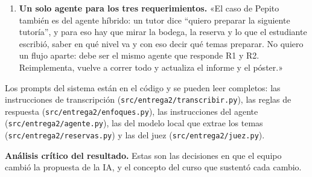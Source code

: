 \documentclass[11pt,letterpaper]{article}
\newcommand{\cod}[1]{\texttt{\small #1}}
\begin{document}
\begin{enumerate}[leftmargin=1.5em,itemsep=4pt]
\item \textbf{Un solo agente para los tres requerimientos.} «El caso de Pepito también es del agente híbrido: un tutor dice “quiero preparar la siguiente tutoría”, y para eso hay que mirar la bodega, la reserva y lo que el estudiante escribió, saber en qué nivel va y con eso decir qué temas preparar. No quiero un flujo aparte: debe ser el mismo agente que responde R1 y R2. Reimplementa, vuelve a correr todo y actualiza el informe y el póster.»
\end{enumerate}

Los prompts del sistema están en el código y se pueden leer completos: las instrucciones de transcripción (\cod{src/entrega2/transcribir.py}), las reglas de respuesta (\cod{src/entrega2/enfoques.py}), las instrucciones del agente (\cod{src/entrega2/agente.py}), las del modelo local que extrae los temas (\cod{src/\allowbreak{}entrega2/\allowbreak{}reservas.py}) y las del juez (\cod{src/entrega2/juez.py}).

\textbf{Análisis crítico del resultado.} Estas son las decisiones en que el equipo cambió la propuesta de la IA, y el concepto del curso que sustentó cada cambio.
\end{document}
